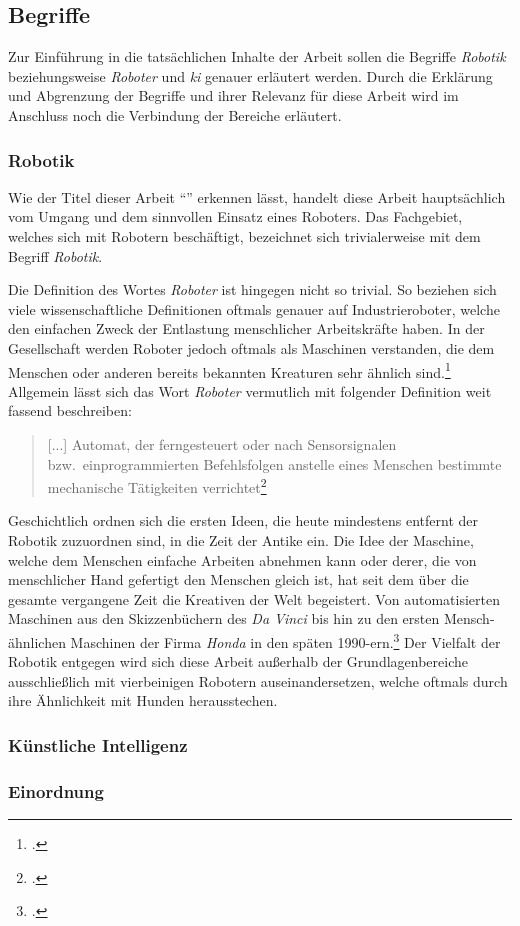 \subsection{Begriffe}

Zur Einführung in die tatsächlichen Inhalte der Arbeit sollen die Begriffe \emph{Robotik} beziehungsweise \emph{Roboter} und \emph{\gls{ki}} genauer erläutert werden.
Durch die Erklärung und Abgrenzung der Begriffe und ihrer Relevanz für diese Arbeit wird im Anschluss noch die Verbindung der Bereiche erläutert.

\subsubsection{Robotik}
Wie der Titel dieser Arbeit \enquote{\mytitle} erkennen lässt, handelt diese Arbeit hauptsächlich vom Umgang und dem sinnvollen Einsatz eines Roboters.
Das Fachgebiet, welches sich mit Robotern beschäftigt, bezeichnet sich trivialerweise mit dem Begriff \emph{Robotik}.

Die Definition des Wortes \emph{Roboter} ist hingegen nicht so trivial.
So beziehen sich viele wissenschaftliche Definitionen oftmals genauer auf Industrieroboter, welche den einfachen Zweck der Entlastung menschlicher Arbeitskräfte haben.
In der Gesellschaft werden Roboter jedoch oftmals als Maschinen verstanden, die dem Menschen oder anderen bereits bekannten Kreaturen sehr ähnlich sind.\footcite{grundlagen_der_robotik}
Allgemein lässt sich das Wort \emph{Roboter} vermutlich mit folgender Definition weit fassend beschreiben:

\begin{quote}
    [...] Automat, der ferngesteuert oder nach Sensorsignalen bzw.\ einprogrammierten Befehlsfolgen anstelle eines Menschen bestimmte mechanische Tätigkeiten verrichtet\footcite{duden_roboter}
\end{quote}


Geschichtlich ordnen sich die ersten Ideen, die heute mindestens entfernt der Robotik zuzuordnen sind, in die Zeit der Antike ein.
Die Idee der Maschine, welche dem Menschen einfache Arbeiten abnehmen kann oder derer, die von menschlicher Hand gefertigt den Menschen gleich ist, hat seit dem über die gesamte vergangene Zeit die Kreativen der Welt begeistert.
Von automatisierten Maschinen aus den Skizzenbüchern des \emph{Da Vinci} bis hin zu den ersten Mensch-ähnlichen Maschinen der Firma \emph{Honda} in den späten \num{1990}-ern.\footcite{grundlagen_der_robotik}
Der Vielfalt der Robotik entgegen wird sich diese Arbeit außerhalb der Grundlagenbereiche ausschließlich mit vierbeinigen Robotern auseinandersetzen, welche oftmals durch ihre Ähnlichkeit mit Hunden herausstechen.

\subsubsection{Künstliche Intelligenz}


\subsubsection{Einordnung}

